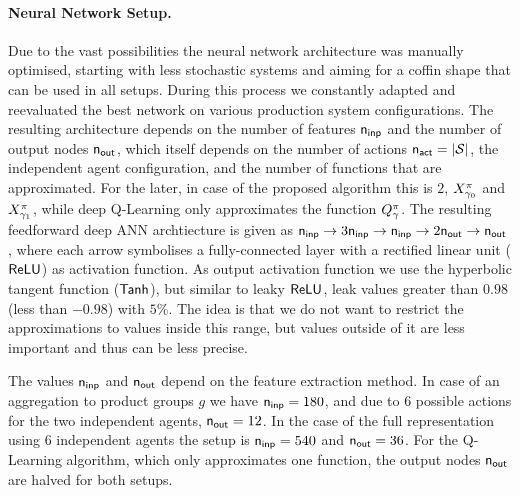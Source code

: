 \documentclass[envcountsame]{llncs}
\begin{document}
\paragraph*{Neural Network Setup.}
%
Due to the vast possibilities the neural network architecture was manually optimised, starting with
less stochastic systems and aiming for a coffin shape that can be used in all setups. During this
process we constantly adapted and reevaluated the best network on various production system
configurations. The resulting architecture depends on the number of features \(\mathsf{n_{inp}}\) and the
number of output nodes \(\mathsf{n_{out}}\), which itself depends on the number of actions
\(\mathsf{n_{act}} = \lvert{\mathcal{S}}\rvert\), the independent agent configuration, and the number of functions that
are approximated. For the later, in case of the proposed algorithm this is \(2\),
\(X^\pi_{\gamma_{0}}\) and \(X^\pi_{\gamma_{1}}\), while deep Q-Learning only approximates the
function \(Q_{\gamma}^\pi\).
%
The resulting feedforward deep ANN archtiecture is given as %
\(\anninp %
\rightarrow 3 \anninp %
\rightarrow \anninp %
\rightarrow 2 \annout %
\rightarrow \annout %
\), where each arrow symbolises a fully-connected layer with a rectified linear unit (\(\mathsf{ReLU}\)) as
activation function. As output activation function we use the hyperbolic tangent function
(\(\mathsf{Tanh}\)), but similar to leaky \(\mathsf{ReLU}\), leak values greater than \(0.98\) (less than \(-0.98\))
with \(5\%\). The idea is that we do not want to restrict the approximations to values inside this
range, but values outside of it are less important and thus can be less precise.

The values \(\mathsf{n_{inp}}\) and \(\mathsf{n_{out}}\) depend on the feature extraction method. In case of an
aggregation to product groups \(g\) we have \(\mathsf{n_{inp}}=180\), and due to \(6\) possible actions for
the two independent agents, \(\mathsf{n_{out}}=12\).
In the case of the full representation using 6 independent agents the setup is \(\mathsf{n_{inp}}=540\) and
\(\mathsf{n_{out}}=36\).
For the Q-Learning algorithm, which only approximates one function, the output nodes
\(\mathsf{n_{out}}\) are halved for both setups.
\end{document}
